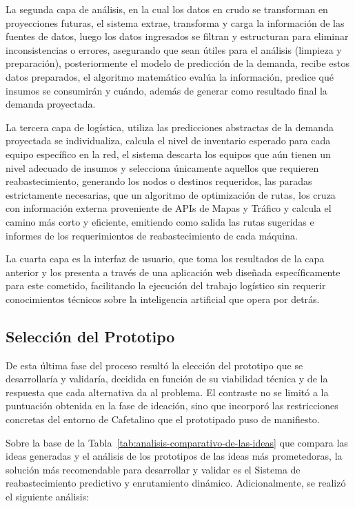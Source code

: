 La segunda capa de análisis, en la cual los datos en crudo se transforman en proyecciones futuras, el sistema extrae, transforma y carga la información de las fuentes de datos, luego los datos ingresados se filtran y estructuran para eliminar inconsistencias o errores, asegurando que sean útiles para el análisis (limpieza y preparación), posteriormente el modelo de predicción de la demanda, recibe estos datos preparados, el algoritmo matemático evalúa la información, predice qué insumos se consumirán y cuándo, además de generar como resultado final la demanda proyectada.

La tercera capa de logística, utiliza las predicciones abstractas de la demanda proyectada se individualiza, calcula el nivel de inventario esperado para cada equipo específico en la red, el sistema descarta los equipos que aún tienen un nivel adecuado de insumos y selecciona únicamente aquellos que requieren reabastecimiento, generando los nodos o destinos requeridos, las paradas estrictamente necesarias, que un algoritmo de optimización de rutas, los cruza con información externa proveniente de APIs de Mapas y Tráfico y calcula el camino más corto y eficiente, emitiendo como salida las rutas sugeridas e informes de los requerimientos de reabastecimiento de cada máquina.

La cuarta capa es la interfaz de usuario, que toma los resultados de la capa anterior y los presenta a través de una aplicación web diseñada específicamente para este cometido, facilitando la ejecución del trabajo logístico sin requerir conocimientos técnicos sobre la inteligencia artificial que opera por detrás.

\subsection{Selección del Prototipo}\label{selecciuxf3n-del-prototipo}

De esta última fase del proceso resultó la elección del prototipo que se desarrollaría y validaría, decidida en función de su viabilidad técnica y de la respuesta que cada alternativa da al problema. El contraste no se limitó a la puntuación obtenida en la fase de ideación, sino que incorporó las restricciones concretas del entorno de Cafetalino que el prototipado puso de manifiesto.

Sobre la base de la Tabla~\ref{tab:analisis-comparativo-de-las-ideas} que compara las ideas generadas y el análisis de los prototipos de las ideas más prometedoras, la solución más recomendable para desarrollar y validar es el Sistema de reabastecimiento predictivo y enrutamiento dinámico. Adicionalmente, se realizó el siguiente análisis:

